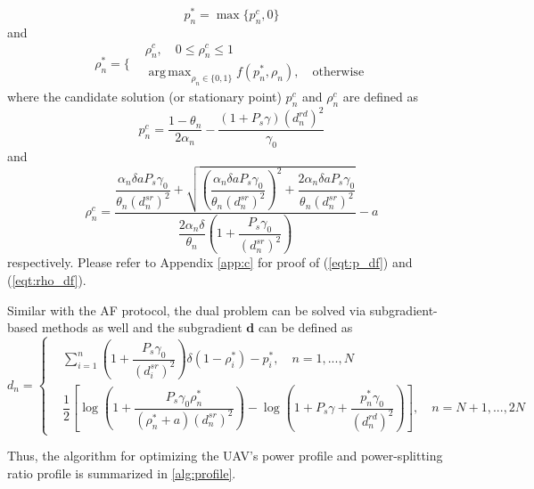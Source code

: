 \documentclass[12pt, draftclsnofoot, onecolumn]{IEEEtran}
\DeclareMathOperator*{\argmax}{arg\,max}
\begin{document}
\begin{equation}\label{eqt:p_df}
p^{*}_{n}=\max\{p^{c}_{n},0\}
\end{equation}
and
\begin{equation}\label{eqt:rho_df}
\rho^{*}_{n}=\left.\{
\begin{aligned}
&\rho^{c}_{n},\quad 0\leq\rho^{c}_{n}\leq 1\\
&\mathop{\argmax}_{\rho_{n}\in\{0,1\}}f(p^{*}_{n},\rho_{n}),\quad\text{otherwise}
\end{aligned}
\right.
\end{equation}
where the candidate solution (or stationary point) $p^{c}_{n}$ and $\rho^{c}_{n}$ are defined as
\begin{equation}\label{eqt:candi_p_df}
p^{c}_{n}=\dfrac{1-\theta_{n}}{2\alpha_{n}}-\dfrac{(1+P_{s}\gamma)(d^{rd}_{n})^{2}}{\gamma_{0}}
\end{equation}
and 
\begin{equation}\label{eqt:candi_rho_df}
\rho^{c}_{n}=\dfrac{\dfrac{\alpha_{n}\delta aP_{s}\gamma_{0}}{\theta_{n}(d^{sr}_{n})^{2}}    
+\sqrt{(\dfrac{\alpha_{n}\delta aP_{s}\gamma_{0}}{\theta_{n}(d^{sr}_{n})^{2}})^2+\dfrac{2\alpha_{n}\delta aP_{s}\gamma_{0}}{\theta_{n}(d^{sr}_{n})^{2}}}}{\dfrac{2\alpha_{n}\delta}{\theta_{n}}(1+\dfrac{P_{s}\gamma_{0}}{(d^{sr}_{n})^{2}})}-a
\end{equation}
respectively. Please refer to Appendix \ref{app:c} for proof of (\ref{eqt:p_df}) and (\ref{eqt:rho_df}).

Similar with the AF protocol, the dual problem can be solved via subgradient-based methods as well and the  subgradient $\bm{d}$ can be defined as 
\begin{equation}
d_{n}=\left\{
\begin{aligned}
&\sum\limits _{i=1}^{n}(1+\dfrac{P_{s}\gamma_{0}}{(d^{sr}_{i})^{2}})\delta(1-\rho^{*}_{i})-p^{*}_{i},\quad n=1,...,N\\
&\dfrac{1}{2}[\log (1+\dfrac{P_{s}\gamma_{0}\rho^{*}_{n}}{(\rho^{*}_{n}+a)(d^{sr}_{n})^{2}})-\log (1+P_{s}\gamma+\dfrac{p^{*}_{n}\gamma_{0}}{(d^{rd}_{n})^{2}})],\quad n=N+1,...,2N
\end{aligned}
\right.
\end{equation}


Thus, the algorithm for optimizing the UAV's power profile and power-splitting ratio profile is summarized in \ref{alg:profile}.
\end{document}
